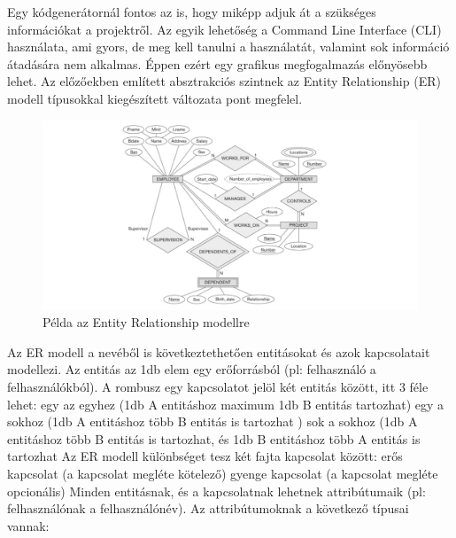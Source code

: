 \documentclass[a4paper,12pt,oneside]{report}
\begin{document}
\begin{justify}

	Egy kódgenerátornál fontos az is, hogy miképp adjuk át a szükséges információkat a projektről. Az egyik lehetőség a Command Line Interface (CLI) használata, ami gyors, de meg kell tanulni a használatát, valamint sok információ átadására nem alkalmas. Éppen ezért egy grafikus megfogalmazás előnyösebb lehet. Az előzőekben említett absztrakciós szintnek az Entity Relationship (ER) modell típusokkal kiegészített változata pont megfelel.

	\begin{figure}[h]
		\includegraphics[width=\textwidth]{contents/images/ermodell_example.png}
		\caption{Példa az Entity Relationship modellre \cite{website:example_of_er} }
		\label{fig:ermodell_example}
	\end{figure}

	Az ER modell a nevéből is következtethetően entitásokat és azok kapcsolatait modellezi. Az entitás az 1db elem egy erőforrásból (pl: felhasználó a felhasználókból). A rombusz egy kapcsolatot jelöl két entitás között, itt 3 féle lehet:
	egy az egyhez (1db A entitáshoz maximum 1db B entitás tartozhat)
	egy a sokhoz (1db A entitáshoz több B entitás is tartozhat )
	sok a sokhoz (1db A entitáshoz több B entitás is tartozhat, és 1db B entitáshoz több A entitás is tartozhat
	Az ER modell különbséget tesz két fajta kapcsolat között:
	erős kapcsolat (a kapcsolat megléte kötelező)
	gyenge kapcsolat (a kapcsolat megléte opcionális)
	Minden entitásnak, és a kapcsolatnak lehetnek attribútumaik (pl: felhasználónak a felhasználónév). Az attribútumoknak a következő típusai vannak: 


\end{justify}
\end{document}
